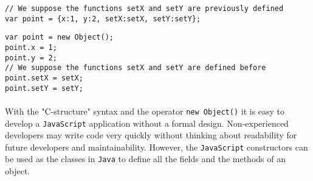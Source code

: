 \begin{lstlisting}[caption=Creating an object with the "C-structure" syntax, label={way2}]
// We suppose the functions setX and setY are previously defined
var point = {x:1, y:2, setX:setX, setY:setY};
\end{lstlisting}

\begin{lstlisting}[caption=Creating an object with the operator "new Object()", label={way3}]
var point = new Object();
point.x = 1;
point.y = 2;
// We suppose the functions setX and setY are defined before
point.setX = setX;
point.setY = setY;
\end{lstlisting}

\paragraph{}
With the "C-structure" syntax and the operator \texttt{new Object()} it is easy to develop a \texttt{JavaScript} application without a formal design. Non-experienced developers may write code very quickly without thinking about readability for future developers and maintainability. However, the \texttt{JavaScript} constructors can be used as the classes in \texttt{Java} to define all the fields and the methods of an object.


